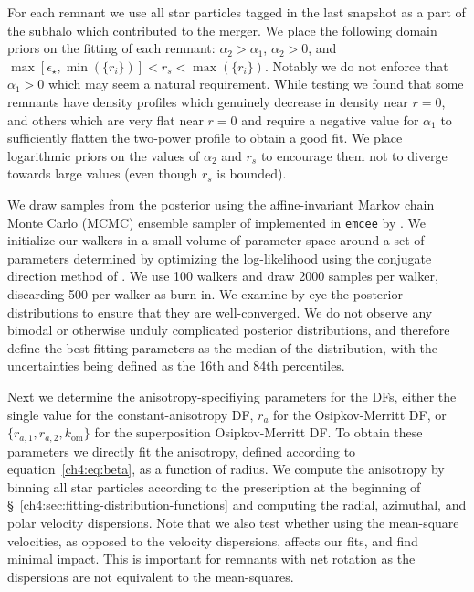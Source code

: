 
For each remnant we use all star particles tagged in the last snapshot as a part of the subhalo which contributed to the merger. We place the following domain priors on the fitting of each remnant: $\alpha_{2} > \alpha_{1}$, $\alpha_{2} > 0$, and $\max[\epsilon_{\star},\min(\{ r_{i} \})] < r_{s} < \max(\{ r_{i} \})$. Notably we do not enforce that $\alpha_{1} > 0$ which may seem a natural requirement. While testing we found that some remnants have density profiles which genuinely decrease in density near $r=0$, and others which are very flat near $r=0$ and require a negative value for $\alpha_{1}$ to sufficiently flatten the two-power profile to obtain a good fit. We place logarithmic priors on the values of $\alpha_{2}$ and $r_{s}$ to encourage them not to diverge towards large values (even though $r_{s}$ is bounded).

We draw samples from the posterior using the affine-invariant Markov chain Monte Carlo (MCMC) ensemble sampler of \textcite{goodman10} implemented in \texttt{emcee} by \textcite{foreman-mackey13}. We initialize our walkers in a small volume of parameter space around a set of parameters determined by optimizing the log-likelihood using the conjugate direction method of \textcite{powell64}. We use 100 walkers and draw 2000 samples per walker, discarding 500 per walker as burn-in. We examine by-eye the posterior distributions to ensure that they are well-converged. We do not observe any bimodal or otherwise unduly complicated posterior distributions, and therefore define the best-fitting parameters as the median of the distribution, with the uncertainties being defined as the 16th and 84th percentiles.

Next we determine the anisotropy-specifiying parameters for the DFs, either the single value for the constant-anisotropy DF, $r_{a}$ for the Osipkov-Merritt DF, or $\{ r_{a,1},r_{a,2},k_\mathrm{om} \}$ for the superposition Osipkov-Merritt DF. To obtain these parameters we directly fit the anisotropy, defined according to equation~\eqref{ch4:eq:beta}, as a function of radius. We compute the anisotropy by binning all star particles according to the prescription at the beginning of \S~\ref{ch4:sec:fitting-distribution-functions} and computing the radial, azimuthal, and polar velocity dispersions. Note that we also test whether using the mean-square velocities, as opposed to the velocity dispersions, affects our fits, and find minimal impact. This is important for remnants with net rotation as the dispersions are not equivalent to the mean-squares.

